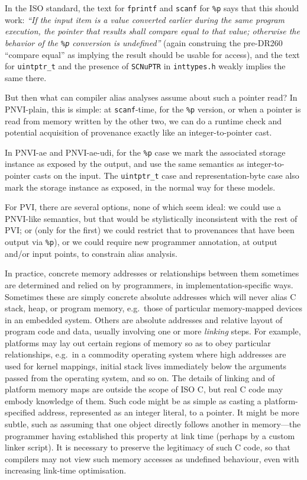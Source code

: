 \documentclass[acmsmall,review,screen]{acmart}\settopmatter{printfolios=true,printccs=false,printacmref=false}
\newcommand{\myparagraph}[1]{\vspace{0.5\baselineskip}\par\noindent{\normalsize\bfseries{#1}}\quad}
\begin{document}
In the ISO standard, the text for \lstinline{fprintf} and
\lstinline{scanf} for \lstinline{%p} says that this should work: \emph{``If
  the input item is a value converted earlier during the same program
  execution, the pointer that results shall compare equal to that
  value; otherwise the behavior of the \texttt{\%p} conversion is
  undefined''}  (again construing the pre-DR260 ``compare equal'' as implying
  the result should be usable for access),
and the text for \lstinline{uintptr_t} and the presence of
\lstinline{SCNuPTR} in \lstinline{inttypes.h} weakly implies the same there.

But then what can compiler alias analyses assume about such a pointer
read?  
In PNVI-plain, this is simple: at \lstinline{scanf}-time, for the \lstinline{%p}
version, or when a pointer is read from memory written by the
other two, we can do a runtime check and potential acquisition of
provenance exactly like an integer-to-pointer cast.
%

In PNVI-ae and PNVI-ae-udi, for the \lstinline{%p}
  case we mark the associated storage instance as exposed by the
  output, and
  use
  the same semantics as integer-to-pointer casts on the input.
  The \lstinline{uintptr_t} case  and 
  representation-byte case also mark the storage instance as exposed,
  in the normal way for these models. 


For PVI, there are several options, none of which seem ideal:
we could use a PNVI-like semantics, but that would be
stylistically inconsistent with the rest of PVI; or (only for the first) we could restrict that to provenances that have been output via
\lstinline{%p}), or
we could require new programmer annotation, at output and/or
input points, to constrain alias analysis. 



\myparagraph{Pointers from device memory and linking}
In practice, concrete memory addresses or relationships between them
sometimes are determined and relied on by programmers, 
in implementation-specific ways.
%
Sometimes these are simply concrete absolute addresses which will
never alias C stack, heap, or program memory,
e.g.~those of particular memory-mapped devices
in an embedded system.
%
Others are absolute addresses and relative layout of program code and
data, usually involving one or more \emph{linking} steps.
For example, platforms may lay out 
certain regions of memory so as to obey
particular relationships, e.g.~in a commodity operating system
where high addresses are used for kernel mappings,
initial stack lives immediately below the arguments
passed from the operating system, and so on.
%
The details of linking and of platform memory maps
are outside the scope of ISO C, but real C code may embody knowledge of them.
Such code might be as simple as casting a
platform-specified address, represented as an integer literal,
to a pointer. It might be more subtle,
such as assuming that one object directly follows another in memory---the
programmer having established
this property at link time (perhaps by a custom linker script).
It is necessary to preserve the legitimacy of such C code,
so that compilers may not view such memory accesses as undefined
behaviour, even with increasing link-time optimisation. 
\end{document}
